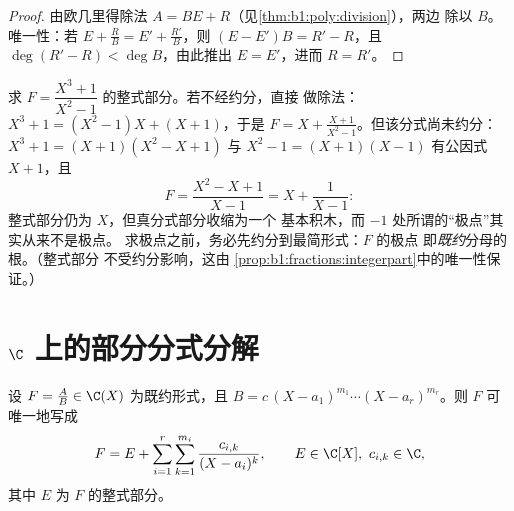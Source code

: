 \begin{proof}
由欧几里得除法 $A = BE + R$（见\cref{thm:b1:poly:division}），两边
除以 $B$。唯一性：若 $E + \frac RB = E' + \frac{R'}{B}$，则 $(E -
E')B = R' - R$，且 $\deg(R' - R) < \deg B$，由此推出 $E = E'$，进而 $R
= R'$。
\end{proof}

\begin{example}\label{ex:b1:fractions:integerpart}
求 $F = \dfrac{X^3 + 1}{X^2 - 1}$ 的整式部分。若不经约分，直接
做除法：$X^3 + 1 = (X^2 - 1)X + (X + 1)$，于是 $F = X +
\frac{X + 1}{X^2 - 1}$。但该分式尚未约分：$X^3 + 1
= (X + 1)(X^2 - X + 1)$ 与 $X^2 - 1 = (X+1)(X-1)$ 有公因式
$X + 1$，且
\[
F = \frac{X^2 - X + 1}{X - 1} = X + \frac{1}{X - 1} :
\]
整式部分仍为 $X$，但真分式部分收缩为一个
基本积木，而 $-1$ 处所谓的“极点”其实从来不是极点。
求极点之前，务必先约分到最简形式：$F$ 的极点
即\emph{既约}分母的根。（整式部分
不受约分影响，这由
\cref{prop:b1:fractions:integerpart}中的唯一性保证。）
\end{example}

\section{$\C$ 上的部分分式分解}

\begin{theorem}[$\C$ 上的分解]\label{thm:b1:fractions:complex}
设 $F = \frac AB \in \C(X)$ 为既约形式，且 $B = c\,(X -
a_1)^{m_1} \cdots (X - a_r)^{m_r}$。则 $F$ 可唯一地写成
\[
F = E + \sum_{i=1}^{r} \sum_{k=1}^{m_i}
\frac{c_{i,k}}{(X - a_i)^k},
\qquad E \in \C[X],\ c_{i,k} \in \C ,
\]
其中 $E$ 为 $F$ 的整式部分。
\end{theorem}


